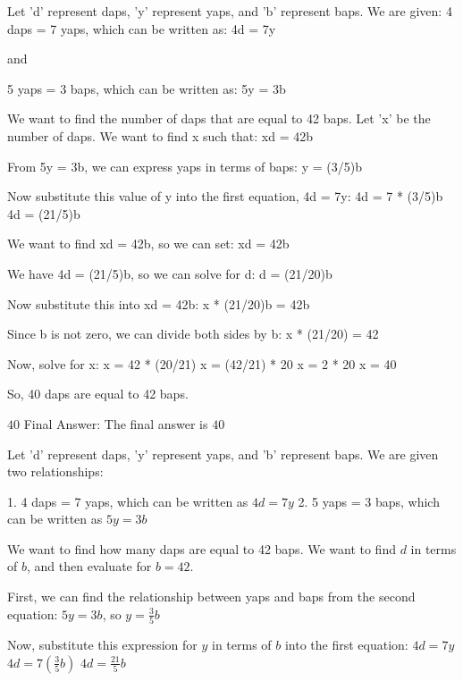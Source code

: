\begin{paracol}{2}

\switchcolumn[0]
\begin{tcolorbox}[breakable, colframe=mydarkgreen!70, colback=mydarkgreen!10, title=Correct response]
Let 'd' represent daps, 'y' represent yaps, and 'b' represent baps.
We are given:
4 daps = 7 yaps, which can be written as:
4d = 7y

and

5 yaps = 3 baps, which can be written as:
5y = 3b

We want to find the number of daps that are equal to 42 baps. Let 'x' be the number of daps. We want to find x such that:
xd = 42b

From 5y = 3b, we can express yaps in terms of baps:
y = (3/5)b

Now substitute this value of y into the first equation, 4d = 7y:
4d = 7 * (3/5)b
4d = (21/5)b

We want to find xd = 42b, so we can set:
xd = 42b

We have 4d = (21/5)b, so we can solve for d:
d = (21/20)b

Now substitute this into xd = 42b:
x * (21/20)b = 42b

Since b is not zero, we can divide both sides by b:
x * (21/20) = 42

Now, solve for x:
x = 42 * (20/21)
x = (42/21) * 20
x = 2 * 20
x = 40

So, 40 daps are equal to 42 baps.

$\boxed{40}$
Final Answer: The final answer is $\boxed{40}$

\end{tcolorbox}

\switchcolumn
\begin{tcolorbox}[breakable, colframe=red!70, colback=red!10, title=Incorrect Response]
Let 'd' represent daps, 'y' represent yaps, and 'b' represent baps.
We are given two relationships:

1. 4 daps = 7 yaps, which can be written as $4d = 7y$
2. 5 yaps = 3 baps, which can be written as $5y = 3b$

We want to find how many daps are equal to 42 baps.  We want to find $d$ in terms of $b$, and then evaluate for $b=42$.

First, we can find the relationship between yaps and baps from the second equation:
$5y = 3b$, so $y = \frac{3}{5}b$

Now, substitute this expression for $y$ in terms of $b$ into the first equation:
$4d = 7y$
$4d = 7\left(\frac{3}{5}b\right)$
$4d = \frac{21}{5}b$


\end{tcolorbox}
\end{paracol}
